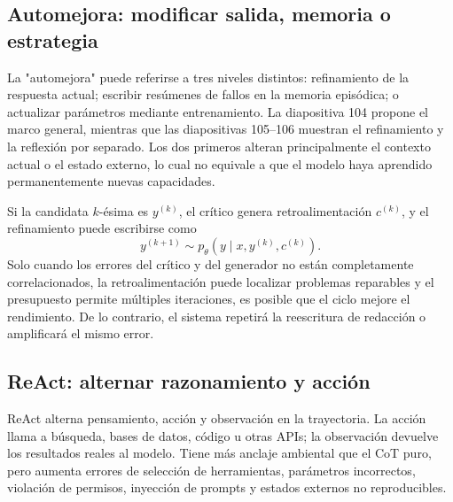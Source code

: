 \subsection{Automejora: modificar salida, memoria o estrategia}

La "automejora" puede referirse a tres niveles distintos: refinamiento de la respuesta actual; escribir resúmenes de fallos en la memoria episódica; o actualizar parámetros mediante entrenamiento. La diapositiva 104 propone el marco general, mientras que las diapositivas 105--106 muestran el refinamiento y la reflexión por separado. Los dos primeros alteran principalmente el contexto actual o el estado externo, lo cual no equivale a que el modelo haya aprendido permanentemente nuevas capacidades.




Si la candidata $k$-ésima es $y^{(k)}$, el crítico genera retroalimentación $c^{(k)}$, y el refinamiento puede escribirse como
\[
y^{(k+1)}\sim p_{\theta}(y\mid x,y^{(k)},c^{(k)}).
\]
Solo cuando los errores del crítico y del generador no están completamente correlacionados, la retroalimentación puede localizar problemas reparables y el presupuesto permite múltiples iteraciones, es posible que el ciclo mejore el rendimiento. De lo contrario, el sistema repetirá la reescritura de redacción o amplificará el mismo error.

\subsection{ReAct: alternar razonamiento y acción}

ReAct alterna pensamiento, acción y observación en la trayectoria. La acción llama a búsqueda, bases de datos, código u otras APIs; la observación devuelve los resultados reales al modelo. Tiene más anclaje ambiental que el CoT puro, pero aumenta errores de selección de herramientas, parámetros incorrectos, violación de permisos, inyección de prompts y estados externos no reproducibles.


